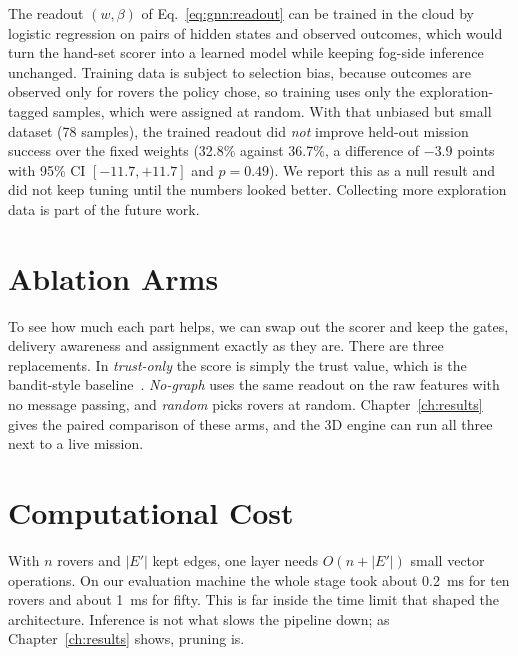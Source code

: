 The readout $(w,\beta)$ of Eq.~\eqref{eq:gnn:readout} can be trained in the
cloud by logistic regression on pairs of hidden states and observed
outcomes, which would turn the hand-set scorer into a learned model while
keeping fog-side inference unchanged. Training data is subject to selection
bias, because outcomes are observed only for rovers the policy chose, so
training uses only the exploration-tagged samples, which were assigned at
random. With that unbiased but small dataset (78 samples), the trained
readout did \emph{not} improve held-out mission success over the fixed
weights (32.8\% against 36.7\%, a difference of $-3.9$ points with 95\% CI
$[-11.7,+11.7]$ and $p=0.49$). We report this as a null result and did not
keep tuning until the numbers looked better. Collecting more exploration data
is part of the future work.

\section{Ablation Arms}

To see how much each part helps, we can swap out the scorer and keep the
gates, delivery awareness and assignment exactly as they are. There are three
replacements. In \emph{trust-only} the score is simply the trust value, which
is the bandit-style baseline~\cite{auer2002}. \emph{No-graph} uses the same
readout on the raw features with no message passing, and \emph{random} picks
rovers at random. Chapter~\ref{ch:results} gives the paired comparison of these
arms, and the 3D engine can run all three next to a live mission.

\section{Computational Cost}

With $n$ rovers and $|E'|$ kept edges, one layer needs $O(n+|E'|)$ small
vector operations. On our evaluation machine the whole stage took about
0.2~ms for ten rovers and about 1~ms for fifty. This is far inside the time
limit that shaped the architecture. Inference is not what slows the pipeline
down; as Chapter~\ref{ch:results} shows, pruning is.
